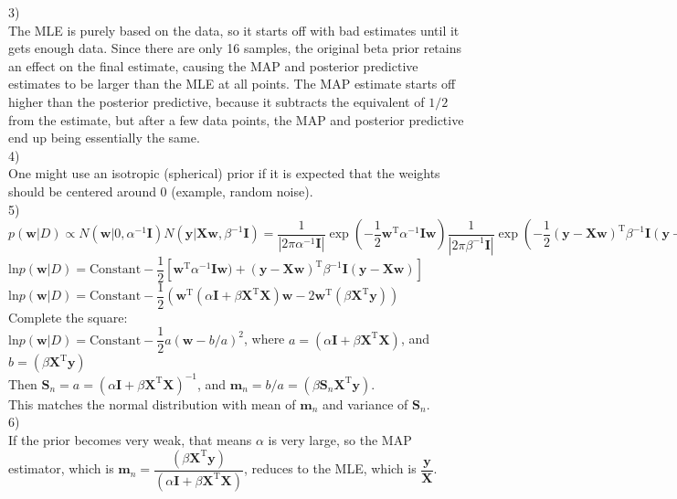 \documentclass[submit]{harvardml}
\begin{document}
3)\\
The MLE is purely based on the data, so it starts off with bad estimates until it gets enough data.  Since there are only 16 samples, the original beta prior retains an effect on the final estimate, causing the MAP and posterior predictive estimates to be larger than the MLE at all points.  The MAP estimate starts off higher than the posterior predictive, because it subtracts the equivalent of $1/2$ from the estimate, but after a few data points, the MAP and posterior predictive end up being essentially the same.
\\
4)\\
One might use an isotropic (spherical) prior if it is expected that the weights should be centered around 0 (example, random noise).  
\\
5)\\
$p(\textbf{w}|D) \propto N(\textbf{w}|0,\alpha^{-1}\textbf{I})N(\textbf{y}|\textbf{X}\textbf{w},\beta^{-1}\textbf{I}) = \dfrac{1}{|2\pi \alpha^{-1}\textbf{I}|}\exp(-\dfrac{1}{2}\textbf{w}^{\textrm{T}}\alpha^{-1}\textbf{I}\textbf{w}) \dfrac{1}{|2\pi \beta^{-1}\textbf{I}|}\exp(-\dfrac{1}{2}(\textbf{y}-\textbf{X}\textbf{w})^{\textrm{T}}\beta^{-1}\textbf{I}(\textbf{y}-\textbf{X}\textbf{w}))$\\
$\textrm{ln} p(\textbf{w}|D) = \textrm{Constant} - \dfrac{1}{2}[\textbf{w}^{\textrm{T}}\alpha^{-1}\textbf{I}\textbf{w}) + (\textbf{y}-\textbf{X}\textbf{w})^{\textrm{T}}\beta^{-1}\textbf{I}(\textbf{y}-\textbf{X}\textbf{w})]$\\
$\textrm{ln} p(\textbf{w}|D) = \textrm{Constant} - \dfrac{1}{2}(\textbf{w}^{\textrm{T}}(\alpha\textbf{I}+\beta \textbf{X}^{\textrm{T}}\textbf{X})\textbf{w}-2\textbf{w}^{\textrm{T}}(\beta\textbf{X}^{\textrm{T}}\textbf{y}))$\\
Complete the square:\\
$\textrm{ln} p(\textbf{w}|D) = \textrm{Constant} - \dfrac{1}{2}a (\textbf{w}-b/a)^2$, where $a=(\alpha\textbf{I}+ \beta \textbf{X}^{\textrm{T}}\textbf{X})$, and $b=(\beta\textbf{X}^{\textrm{T}}\textbf{y})$\\
Then $\textbf{S}_n=a=(\alpha\textbf{I}+ \beta \textbf{X}^{\textrm{T}}\textbf{X})^{-1}$, and
$\textbf{m}_n=b/a=(\beta \textbf{S}_n \textbf{X}^{\textrm{T}}\textbf{y})$.\\
This matches the normal distribution with mean of $\textbf{m}_n$ and variance of $\textbf{S}_n$.
\\
6)\\
If the prior becomes very weak, that means $\alpha$ is very large, so the MAP estimator, which is $\textbf{m}_n=\dfrac{(\beta \textbf{X}^{\textrm{T}}\textbf{y})}{(\alpha\textbf{I}+ \beta \textbf{X}^{\textrm{T}}\textbf{X})}$, reduces to the MLE, which is $\dfrac{\textbf{y}}{\textbf{X}}$.
\end{document}

